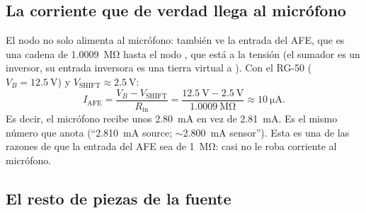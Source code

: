\subsection{La corriente que de verdad llega al micrófono}\label{sec:c03-carga}

El nodo  no solo alimenta al micrófono: también ve la entrada del AFE, que es una cadena de
\SI{1.0009}{\mega\ohm} hasta el nodo , que está a la tensión  (el sumador es un inversor, su
entrada inversora es una tierra virtual a ). Con el RG-50 ($V_B = \SI{12.5}{\volt}$) y
$V_{\mathrm{SHIFT}} \approx \SI{2.5}{\volt}$:
\begin{equation*}
  I_{\mathrm{AFE}} = \frac{V_B - V_{\mathrm{SHIFT}}}{R_{\mathrm{in}}} = \frac{\SI{12.5}{\volt}-\SI{2.5}{\volt}}{\SI{1.0009}{\mega\ohm}}
  \approx \SI{10}{\micro\ampere}.
\end{equation*}
Es decir, el micrófono recibe unos \SI{2.80}{\milli\ampere} en vez de \SI{2.81}{\milli\ampere}. Es el mismo número que
anota  (``\SI{2.810}{\milli\ampere} source; $\sim$\SI{2.800}{\milli\ampere}
sensor''). Esta es una de las razones de que la entrada del AFE sea de \SI{1}{\mega\ohm}: casi no le roba corriente
al micrófono.

\subsection{El resto de piezas de la fuente}

